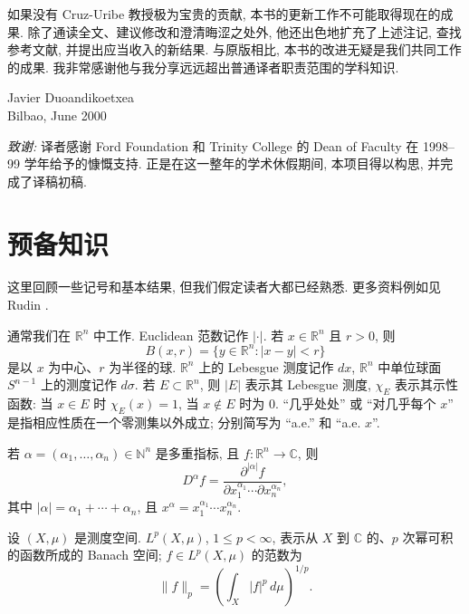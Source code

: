 如果没有 Cruz-Uribe 教授极为宝贵的贡献, 本书的更新工作不可能取得现在的成果. 除了通读全文、建议修改和澄清晦涩之处外, 他还出色地扩充了上述注记, 查找参考文献, 并提出应当收入的新结果. 与原版相比, 本书的改进无疑是我们共同工作的成果. 我非常感谢他与我分享远远超出普通译者职责范围的学科知识.

\begin{flushright}
Javier Duoandikoetxea\\
Bilbao, June 2000
\end{flushright}

\clearpage
\hypertarget{frontmatter-page-009}{}

\noindent\textit{致谢:} 译者感谢 Ford Foundation 和 Trinity College 的 Dean of Faculty 在 1998--99 学年给予的慷慨支持. 正是在这一整年的学术休假期间, 本项目得以构思, 并完成了译稿初稿.

\clearpage
\thispagestyle{empty}
\hypertarget{frontmatter-page-010}{}
\null
\clearpage

\hypertarget{frontmatter-page-011}{}
\section*{预备知识}
\label{front:preliminaries}

这里回顾一些记号和基本结果, 但我们假定读者大都已经熟悉. 更多资料例如见 Rudin .

通常我们在 $\mathbb R^n$ 中工作. Euclidean 范数记作 $|\cdot|$. 若 $x\in\mathbb R^n$ 且 $r>0$, 则
\[
B(x,r)=\{y\in\mathbb R^n:|x-y|<r\}
\]
是以 $x$ 为中心、$r$ 为半径的球. $\mathbb R^n$ 上的 Lebesgue 测度记作 $dx$, $\mathbb R^n$ 中单位球面 $S^{n-1}$ 上的测度记作 $d\sigma$. 若 $E\subset\mathbb R^n$, 则 $|E|$ 表示其 Lebesgue 测度, $\chi_E$ 表示其示性函数: 当 $x\in E$ 时 $\chi_E(x)=1$, 当 $x\notin E$ 时为 $0$. ``几乎处处'' 或 ``对几乎每个 $x$'' 是指相应性质在一个零测集以外成立; 分别简写为 ``a.e.'' 和 ``a.e. $x$''.

若 $\alpha=(\alpha_1,\ldots,\alpha_n)\in\mathbb N^n$ 是多重指标, 且 $f:\mathbb R^n\to\mathbb C$, 则
\[
D^\alpha f=
\frac{\partial^{|\alpha|}f}{\partial x_1^{\alpha_1}\cdots\partial x_n^{\alpha_n}},
\]
其中 $|\alpha|=\alpha_1+\cdots+\alpha_n$, 且 $x^\alpha=x_1^{\alpha_1}\cdots x_n^{\alpha_n}$.

设 $(X,\mu)$ 是测度空间. $L^p(X,\mu)$, $1\leq p<\infty$, 表示从 $X$ 到 $\mathbb C$ 的、$p$ 次幂可积的函数所成的 Banach 空间; $f\in L^p(X,\mu)$ 的范数为
\[
\|f\|_p=\left(\int_X|f|^p\,d\mu\right)^{1/p}.
\]

